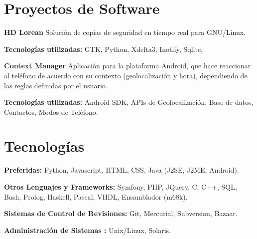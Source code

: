 \documentclass[margin,line]{resume}
\begin{document}
\begin{resume}
\section{\sc Proyectos de Software } 
\begin{list1}
\item[] {\bf HD Lorean}
Solución de copias de seguridad en tiempo real para GNU/Linux.
\vspace*{.05in}
\begin{list2}
\item {\bf Tecnologías utilizadas:} GTK, Python, Xdelta3, Inotify, Sqlite.\\
\end{list2} 

\item[] {\bf Context Manager}
Aplicación para la plataforma Android, que hace reaccionar al teléfono de acuerdo con su contexto (geolocalización y hora), dependiendo de las reglas definidas por el usuario.
\vspace*{-.13in}
\begin{list2}
\item {\bf Tecnologías utilizadas:} Android SDK, APIs de Geolocalización, Base de datos,
Contactos, Modos de Teléfono.
\end{list2}
\end{list1}

\section{\sc Tecnologías} 
\begin{list1}
\item[]{\bf Preferidas:} Python, Javascript, HTML, CSS, Java (J2SE, J2ME, Android). 
\item[]{\bf Otros Lenguajes y Frameworks:} Symfony, PHP, JQuery, C, C++, SQL, Bash, Prolog, Haskell, Pascal, VHDL, Ensamblador (m68k).
\item[]{\bf Sistemas de Control de Revisiones:} Git, Mercurial, Subversion, Bazaar.
\item[]{\bf Administración de Sistemas :} Unix/Linux, Solaris.
\end{list1}


\end{resume}
\end{document}
